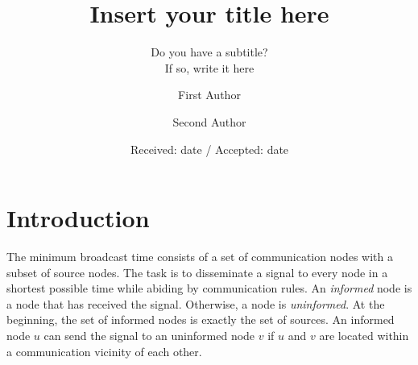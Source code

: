 \title{Insert your title here%
}
\subtitle{Do you have a subtitle?\\ If so, write it here}


\author{First Author         \and
        Second Author %
}



\date{Received: date / Accepted: date}


\maketitle

\begin{abstract}
\keywords{}
\end{abstract}

\section{Introduction}
\label{intro}
The minimum broadcast time consists of a set of communication nodes with a subset of source nodes. 
The task is to disseminate a signal to every node in a shortest possible time while abiding by communication rules.
An \emph{informed} node is a node that has received the signal.
Otherwise, a node is \emph{uninformed}.
At the beginning, the set of informed nodes is exactly the set of sources.
An informed node $u$ can send the signal to an uninformed node $v$ if $u$ and $v$ are located within a communication vicinity of each other.

